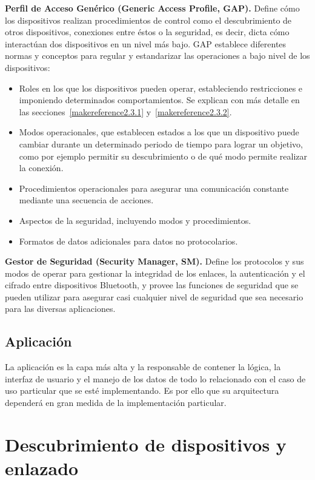 \textbf{Perfil de Acceso Genérico (Generic Access Profile, GAP).} Define cómo los dispositivos realizan procedimientos de control como el descubrimiento de otros dispositivos, conexiones entre éstos o la seguridad, es decir, dicta cómo interactúan dos dispositivos en un nivel más bajo.
GAP establece diferentes normas y conceptos para regular y estandarizar las operaciones a bajo nivel de los dispositivos:
\begin{itemize}
	\item Roles en los que los dispositivos pueden operar, estableciendo restricciones e imponiendo determinados comportamientos. Se explican con más detalle en las secciones~\ref{makereference2.3.1} y~\ref{makereference2.3.2}.
	\item Modos operacionales, que establecen estados a los que un dispositivo puede cambiar durante un determinado periodo de tiempo para lograr un objetivo, como por ejemplo permitir su descubrimiento o de qué modo permite realizar la conexión.
	\item Procedimientos operacionales para asegurar una comunicación constante mediante una secuencia de acciones.
	\item Aspectos de la seguridad, incluyendo modos y procedimientos.
	\item Formatos de datos adicionales para datos no protocolarios.
\end{itemize}


\textbf{Gestor de Seguridad (Security Manager, SM).} Define los protocolos y sus modos de operar para gestionar la integridad de los enlaces, la autenticación y el cifrado entre dispositivos Bluetooth, y provee las funciones de seguridad que se pueden utilizar para asegurar casi cualquier nivel de seguridad que sea necesario para las diversas aplicaciones.
 
\subsection{Aplicación}
\label{makereference2.2.3}

La aplicación es la capa más alta y la responsable de contener la lógica, la interfaz de usuario y el manejo de los datos de todo lo relacionado con el caso de uso particular que se esté implementando. Es por ello que su arquitectura dependerá en gran medida de la implementación particular. 

\section{Descubrimiento de dispositivos y enlazado}
\label{makereference2.3}

